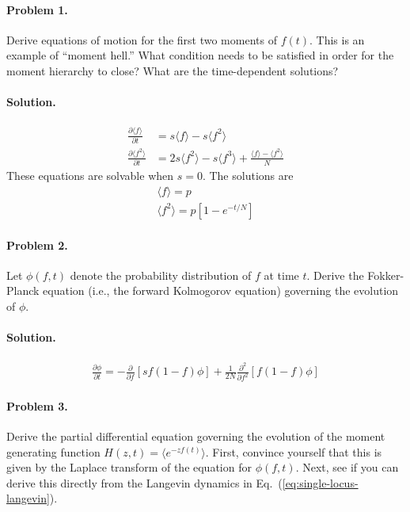 \documentclass[11pt]{article}
\newcommand{\eq}[1]{Eq.~(\ref{#1})}
\begin{document}
\paragraph{Problem 1.} Derive equations of motion for the first two moments of $f(t)$. This is an example of ``moment hell.'' What condition needs to be satisfied in order for the moment hierarchy to close? What are the time-dependent solutions?

\paragraph{Solution.}
\begin{subequations}
\begin{align}
\frac{\partial \langle f \rangle}{\partial t} & = s \langle f \rangle - s \langle f^2 \rangle \\
\frac{\partial \langle f^2 \rangle}{\partial t} & = 2 s \langle f^2 \rangle - s \langle f^3 \rangle + \frac{\langle f \rangle-\langle f^2 \rangle}{N} 
\end{align}
\end{subequations} 
These equations are solvable when $s=0$. The solutions are
\begin{subequations}
\begin{align}
\langle f \rangle = p \\
\langle f^2 \rangle = p \left[ 1 - e^{-t/N} \right]
\end{align}
\end{subequations}

\paragraph{Problem 2.} Let $\phi(f,t)$ denote the probability distribution of $f$ at time $t$. Derive the Fokker-Planck equation (i.e., the forward Kolmogorov equation) governing the evolution of $\phi$. 

\paragraph{Solution.} 
\begin{align}
\frac{\partial \phi}{\partial t} = - \frac{\partial}{\partial f} \left[ s f(1-f) \phi \right] + \frac{1}{2N} \frac{\partial^2}{\partial f^2} \left[ f(1-f) \phi \right]
\end{align}

\paragraph{Problem 3.} Derive the partial differential equation governing the evolution of the moment generating function $H(z,t) = \langle e^{-zf(t)} \rangle$. First, convince yourself that this is given by the Laplace transform of the equation for $\phi(f,t)$. Next, see if you can derive this directly from the Langevin dynamics in \eq{eq:single-locus-langevin}. 
\end{document}
